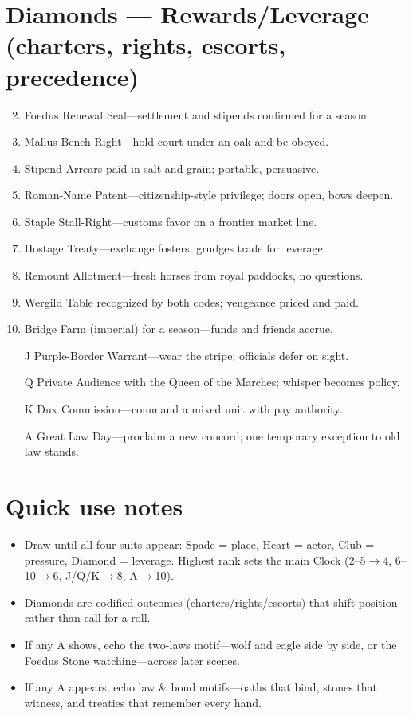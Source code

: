 \section*{Diamonds --- Rewards/Leverage (charters, rights, escorts, precedence)}
\label{sec:vilikari-rewards}
\begin{enumerate}
\setcounter{enumi}{1}
\item Foedus Renewal Seal---settlement and stipends confirmed for a season.
\item Mallus Bench-Right---hold court under an oak and be obeyed.
\item Stipend Arrears paid in salt and grain; portable, persuasive.
\item Roman-Name Patent---citizenship-style privilege; doors open, bows deepen.
\item Staple Stall-Right---customs favor on a frontier market line.
\item Hostage Treaty---exchange fosters; grudges trade for leverage.
\item Remount Allotment---fresh horses from royal paddocks, no questions.
\item Wergild Table recognized by both codes; vengeance priced and paid.
\item Bridge Farm (imperial) for a season---funds and friends accrue.
\item[J] Purple-Border Warrant---wear the stripe; officials defer on sight.
\item[Q] Private Audience with the Queen of the Marches; whisper becomes policy.
\item[K] Dux Commission---command a mixed unit with pay authority.
\item[A] Great Law Day---proclaim a new concord; one temporary exception to old law stands.
\end{enumerate}

\section*{Quick use notes}
\label{sec:vilikari-quick-use}
\begin{itemize}
\item Draw until all four suits appear: Spade = place, Heart = actor, Club = pressure, Diamond = leverage. Highest rank sets the main Clock (2--5$\rightarrow$4, 6--10$\rightarrow$6, J/Q/K$\rightarrow$8, A$\rightarrow$10).
\item Diamonds are codified outcomes (charters/rights/escorts) that shift position rather than call for a roll.
\item If any A shows, echo the two-laws motif---wolf and eagle side by side, or the Foedus Stone watching---across later scenes.
\item If any A appears, echo law \& bond motifs---oaths that bind, stones that witness, and treaties that remember every hand.
\end{itemize}

